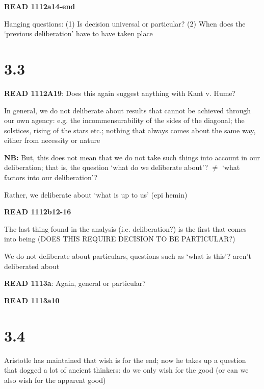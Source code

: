 \documentclass[11pt]{article}
\begin{document}
\noindent\textbf{READ 1112a14-end}
\vspace*{2mm}

\noindent Hanging questions: (1) Is decision universal or particular? (2) When does the `previous deliberation' have to have taken place

\section*{3.3}

\noindent\textbf{READ 1112A19}: Does this again suggest anything with Kant v. Hume?
\vspace*{2mm}

\noindent In general, we do not deliberate about results that cannot be achieved through our own agency: e.g. the incommensurability of the sides of the diagonal; the solstices, rising of the stars etc.; nothing that always comes about the same way, either from necessity or nature
\vspace*{2mm}

\noindent\textbf{NB:} But, this does not mean that we do not take such things into account in our deliberation; that is, the question `what do we deliberate about'? $\neq$ `what factors into our deliberation'?
\vspace*{2mm}

\noindent Rather, we deliberate about `what is up to us' (epi hemin)
\vspace*{2mm}

\noindent\textbf{READ 1112b12-16}
\vspace*{2mm}

\noindent The last thing found in the analysis (i.e. deliberation?) is the first that comes into being (DOES THIS REQUIRE DECISION TO BE PARTICULAR?)
\vspace*{2mm}

\noindent We do not deliberate about particulars, questions such as `what is this'? aren't deliberated about
\vspace*{2mm}

\noindent\textbf{READ 1113a}: Again, general or particular?
\vspace*{2mm}

\noindent\textbf{READ 1113a10}

\section*{3.4}

\noindent Aristotle has maintained that wish is for the end; now he takes up a question that dogged a lot of ancient thinkers: do we only wish for the good (or can we also wish for the apparent good)
\vspace*{2mm}
\end{document}
